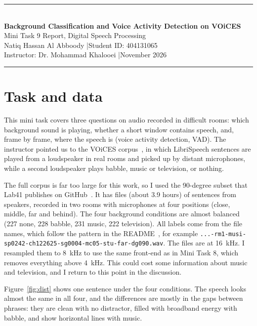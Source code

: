 \documentclass[11pt,a4paper]{article}
\begin{document}
\begin{center}
{\color{navy}\rule{\textwidth}{1.2pt}}\\[6pt]
{\LARGE\bfseries\color{navy} Background Classification and Voice Activity Detection on VOiCES}\\[4pt]
{\large Mini Task 9 Report, Digital Speech Processing}\\[6pt]
Natiq Hassan Al Abboody \quad|\quad Student ID: 404131065\\
Instructor: Dr. Mohammad Khalooei \quad|\quad November 2026\\[2pt]
{\color{gold}\rule{\textwidth}{0.8pt}}
\end{center}

\section{Task and data}
This mini task covers three questions on audio recorded in difficult rooms: which background sound is playing, whether a short window contains speech, and, frame by frame, where the speech is (voice activity detection, VAD). The instructor pointed us to the VOiCES corpus~\cite{voices}, in which LibriSpeech sentences are played from a loudspeaker in real rooms and picked up by distant microphones, while a second loudspeaker plays babble, music or television, or nothing.

The full corpus is far too large for this work, so I used the 90-degree subset that Lab41 publishes on GitHub~\cite{subset}. It has \VFiles{} files (about 3.9 hours) of \VSent{} sentences from \VSpk{} speakers, recorded in two rooms with microphones at four positions (close, middle, far and behind). The four background conditions are almost balanced (227 none, 228 babble, 231 music, 222 television). All labels come from the file names, which follow the pattern in the README~\cite{readme}, for example \texttt{...-rm1-musi-sp0242-\allowbreak ch122625-\allowbreak sg0004-\allowbreak mc05-\allowbreak stu-\allowbreak far-\allowbreak dg090.wav}. The files are at 16~kHz. I resampled them to 8~kHz to use the same front-end as in Mini Task 8, which removes everything above 4~kHz. This could cost some information about music and television, and I return to this point in the discussion.

Figure~\ref{fig:dist} shows one sentence under the four conditions. The speech looks almost the same in all four, and the differences are mostly in the gaps between phrases: they are clean with no distractor, filled with broadband energy with babble, and show horizontal lines with music.
\end{document}
